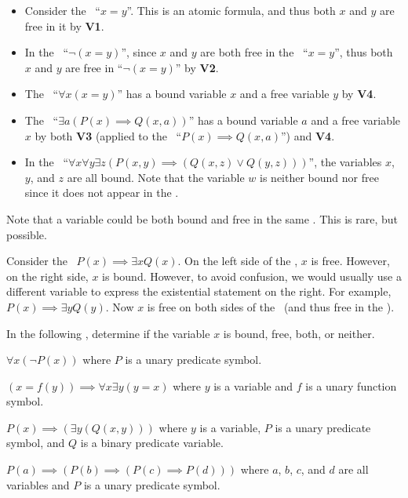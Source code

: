 \begin{example}
    \begin{itemize}[leftmargin=*]
        \item Consider the \wff~``$x=y$''. This is an atomic formula, and thus both $x$ and $y$ are free in it by \textbf{V1}.
        \item In the \wff~``$\lnot(x=y)$'', since $x$ and $y$ are both free in the \wff~``$x=y$'', thus both $x$ and $y$ are free in ``$\lnot(x=y)$'' by \textbf{V2}.
        \item The \wff~``$\forall x (x=y)$'' has a bound variable $x$ and a free variable $y$ by \textbf{V4}.
        \item The \wff~``$\exists a (P(x) \implies Q(x, a))$'' has a bound variable $a$ and a free variable $x$ by both \textbf{V3} (applied to the \wff~``$P(x) \implies Q(x, a)$'') and \textbf{V4}.
        \item In the \wff~``$\forall x \forall y \exists z (P(x,y)\implies (Q(x,z) \lor Q(y,z)))$'', the variables $x$, $y$, and $z$ are all bound. Note that the variable $w$ is neither bound nor free since it does not appear in the \wff.
    \end{itemize}
\end{example}

Note that a variable could be both bound and free in the same \wff. This is rare, but possible.

\begin{example}
    Consider the \wff~$P(x) \implies \exists x Q(x)$. On the left side of the \wff, $x$ is free. However, on the right side, $x$ is bound. However, to avoid confusion, we would usually use a different variable to express the existential statement on the right. For example, $P(x) \implies \exists y Q(y)$. Now $x$ is free on both sides of the \wff~(and thus free in the \wff).
\end{example}

\begin{exercise}
    In the following \wffs, determine if the variable $x$ is bound, free, both, or neither.
    \begin{partquestions}{\alph*}
        \item $\forall x (\lnot P(x))$ where $P$ is a unary predicate symbol.
        \item $(x=f(y)) \implies \forall x \exists y (y=x)$ where $y$ is a variable and $f$ is a unary function symbol.
        \item $P(x) \implies (\exists y (Q(x, y)))$ where $y$ is a variable, $P$ is a unary predicate symbol, and $Q$ is a binary predicate variable.
        \item $P(a) \implies (P(b) \implies (P(c) \implies P(d)))$ where $a$, $b$, $c$, and $d$ are all variables and $P$ is a unary predicate symbol.
    \end{partquestions}
\end{exercise}

